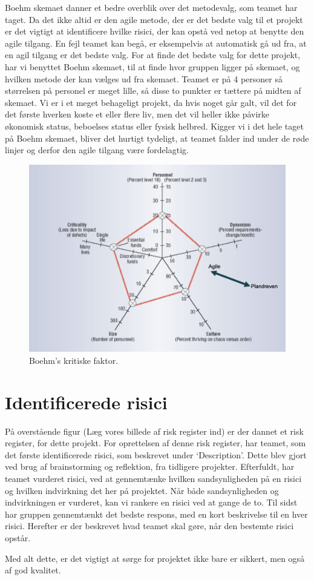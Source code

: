 Boehm skemaet danner et bedre overblik over det metodevalg, som teamet har taget. Da det ikke altid er den agile metode, der er det bedste valg til et projekt er det vigtigt at identificere hvilke risici, der kan opstå ved netop at benytte den agile tilgang. En fejl teamet kan begå, er eksempelvis at automatisk gå ud fra, at en agil tilgang er det bedste valg. For at finde det bedste valg for dette projekt, har vi benyttet Boehm skemaet, til at finde hvor gruppen ligger på skemaet, og hvilken metode der kan vælges ud fra skemaet.
Teamet er på 4 personer så størrelsen på personel er meget lille, så disse to punkter er tættere på midten af skemaet. Vi er i et meget behageligt projekt, da hvis noget går galt, vil det for det første hverken koste et eller flere liv, men det vil heller ikke påvirke økonomisk status, beboelses status eller fysisk helbred. Kigger vi i det hele taget på Boehm skemaet, bliver det hurtigt tydeligt, at teamet falder ind under de røde linjer og derfor den agile tilgang være fordelagtig.

\begin{figure}
    \includegraphics[width=\linewidth]{figures/Boehm.png}
    \caption{Boehm's kritiske faktor.}
    \label{fig:Boehm}
\end{figure}


\section{Identificerede risici}

På overstående figur (Læg vores billede af risk register ind) er der dannet et risk register, for dette projekt. For oprettelsen af denne risk register, har teamet, som det første identificerede risici, som beskrevet under ‘Description’. Dette blev gjort ved brug af brainstorming og reflektion, fra tidligere projekter. Efterfuldt, har teamet vurderet risici, ved at gennemtænke hvilken sandsynligheden på en risici og hvilken indvirkning det her på projektet. Når både sandsynligheden og indvirkningen er vurderet, kan vi rankere en risici ved at gange de to. Til sidst har gruppen gennemtænkt det bedste respons, med en kort beskrivelse til en hver risici. Herefter er der beskrevet hvad teamet skal gøre, når den bestemte risici opstår. 

Med alt dette, er det vigtigt at sørge for projektet ikke bare er sikkert, men også af god kvalitet. 